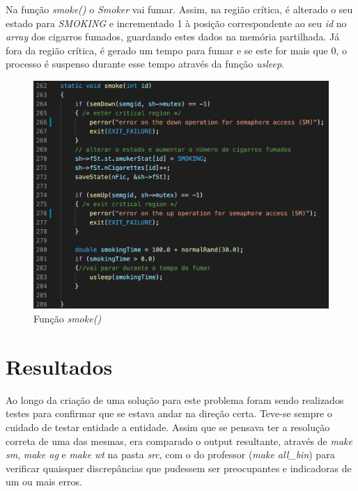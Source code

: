 \documentclass[10pt,portuguese]{article}
\begin{document}
\par Na função \textit{smoke()} o \textit{Smoker} vai fumar. Assim, na região crítica, é alterado o seu estado para \textit{SMOKING} e incrementado 1 à posição correspondente ao seu \textit{id} no \textit{array} dos cigarros fumados, guardando estes dados na memória partilhada. Já fora da região crítica, é gerado um tempo para fumar e se este for mais que 0, o processo é suspenso durante esse tempo através da função \textit{usleep}.

\begin{figure}[!h]
    \centering
    \includegraphics[width=\textwidth]{images/implementation/smoke.png}
    \caption{Função \textit{smoke()}}
\end{figure}



\clearpage

\section{Resultados}
\par Ao longo da criação de uma solução para este problema foram sendo realizados testes para confirmar que se estava andar na direção certa. Teve-se sempre o cuidado de testar entidade a entidade. Assim que se pensava ter a resolução correta de uma das mesmas, era comparado o output resultante, através de \textit{make sm}, \textit{make ag} e \textit{make wt} na pasta \textit{src}, com o do professor (\textit{make all\_bin}) para verificar quaisquer discrepâncias que pudessem ser preocupantes e indicadoras de um ou mais erros.
\end{document}
